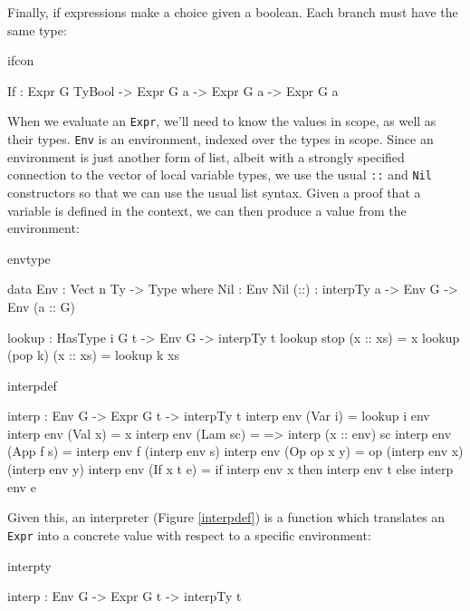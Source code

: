 \noindent
Finally, if expressions make a choice given a boolean. Each branch must
have the same type:

\begin{SaveVerbatim}{ifcon}

If  : Expr G TyBool -> Expr G a -> Expr G a -> Expr G a

\end{SaveVerbatim}

\noindent
When we evaluate an \texttt{Expr}, we'll need to know the values in scope, as well as
their types. \texttt{Env} is an environment, indexed over the types in scope.
Since an environment is just another form of list, albeit with a strongly specified connection
to the vector of local variable types, we use the usual \texttt{::} and \texttt{Nil}
constructors so that we can use the usual list syntax. Given a proof that a variable
is defined in the context, we can then produce a value from the environment:

\begin{SaveVerbatim}{envtype}

data Env : Vect n Ty -> Type where
    Nil  : Env Nil
    (::) : interpTy a -> Env G -> Env (a :: G)

lookup : HasType i G t -> Env G -> interpTy t
lookup stop    (x :: xs) = x
lookup (pop k) (x :: xs) = lookup k xs

\end{SaveVerbatim}

\begin{SaveVerbatim}{interpdef}

interp : Env G -> Expr G t -> interpTy t
interp env (Var i)     = lookup i env
interp env (Val x)     = x
interp env (Lam sc)    = \x => interp (x :: env) sc
interp env (App f s)   = interp env f (interp env s)
interp env (Op op x y) = op (interp env x) (interp env y)
interp env (If x t e)  = if interp env x then interp env t 
                                         else interp env e

\end{SaveVerbatim}

\noindent
Given this, an interpreter (Figure \ref{interpdef})
is a function which translates an \texttt{Expr} into a
concrete \Idris{} value with respect to a specific environment:

\begin{SaveVerbatim}{interpty}

interp : Env G -> Expr G t -> interpTy t

\end{SaveVerbatim}

